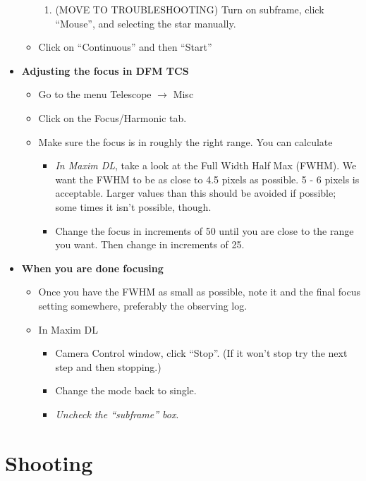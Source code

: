 \documentclass[letterpaper, 12pt]{report}
\begin{document}
\begin{itemize}
\begin{itemize}
\begin{enumerate}
			\item (MOVE TO TROUBLESHOOTING) Turn on subframe, click ``Mouse'', and selecting the star manually.
		\end{enumerate}
		\item Click on ``Continuous'' and then ``Start''
	\end{itemize}
	\item {\large \textbf{Adjusting the focus in DFM TCS}}
	\begin{itemize}
		\item Go to the menu Telescope $\rightarrow$ Misc
		\item Click on the Focus/Harmonic tab.
		\item Make sure the focus is in roughly the right range. You can calculate
		\begin{itemize}
			\item \emph{In Maxim DL}, take a look at the Full Width Half Max (FWHM). We want the FWHM to be as close to 4.5 pixels as possible. 5 - 6 pixels is acceptable. Larger values than this should be avoided if possible; some times it isn't possible, though.
			\item Change the focus in increments of 50 until you are close to the range you want. Then change in increments of 25.
		\end{itemize}
	\end{itemize}
	\item {\large \textbf{When you are done focusing}}
	\begin{itemize}
		\item Once you have the FWHM as small as possible, note it and the final focus setting somewhere, preferably the observing log.
		\item In Maxim DL
		\begin{itemize}
			\item Camera Control window, click ``Stop''. (If it won't stop try the next step and then stopping.)
			\item Change the mode back to single.
			\item \emph{Uncheck the ``subframe'' box}.
		\end{itemize}
	\end{itemize}
\end{itemize}

\chapter{Shooting}\label{ch:shooting}
\end{document}
